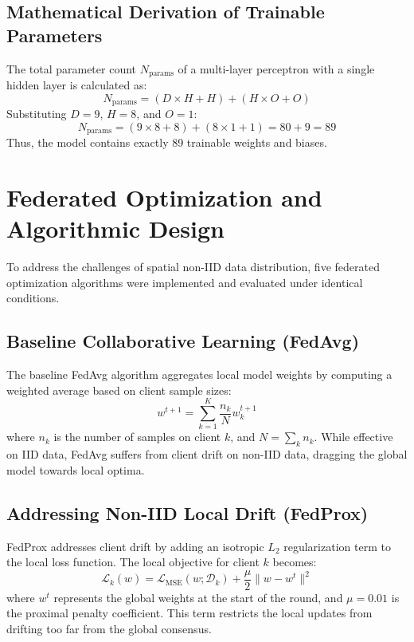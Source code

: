 \subsection{Mathematical Derivation of Trainable Parameters}
The total parameter count $N_{\text{params}}$ of a multi-layer perceptron with a single hidden layer is calculated as:
\begin{equation}
    N_{\text{params}} = (D \times H + H) + (H \times O + O)
\end{equation}
Substituting $D = 9$, $H = 8$, and $O = 1$:
\begin{equation}
    N_{\text{params}} = (9 \times 8 + 8) + (8 \times 1 + 1) = 80 + 9 = 89
\end{equation}
Thus, the model contains exactly 89 trainable weights and biases.

\section{Federated Optimization and Algorithmic Design}
\label{sec:fl-algorithms}

To address the challenges of spatial non-IID data distribution, five federated optimization algorithms were implemented and evaluated under identical conditions.

\subsection{Baseline Collaborative Learning (FedAvg)}
The baseline FedAvg algorithm aggregates local model weights by computing a weighted average based on client sample sizes:
\begin{equation}
    w^{t+1} = \sum_{k=1}^K \frac{n_k}{N} w_k^{t+1}
\end{equation}
where $n_k$ is the number of samples on client $k$, and $N = \sum_k n_k$. While effective on IID data, FedAvg suffers from client drift on non-IID data, dragging the global model towards local optima.

\subsection{Addressing Non-IID Local Drift (FedProx)}
FedProx addresses client drift by adding an isotropic $L_2$ regularization term to the local loss function. The local objective for client $k$ becomes:
\begin{equation}
    \mathcal{L}_k(w) = \mathcal{L}_{\text{MSE}}(w; \mathcal{D}_k) + \frac{\mu}{2} \|w - w^t\|^2
\end{equation}
where $w^t$ represents the global weights at the start of the round, and $\mu = 0.01$ is the proximal penalty coefficient. This term restricts the local updates from drifting too far from the global consensus.

